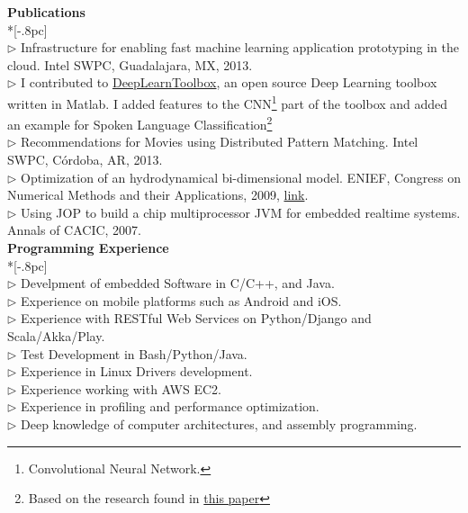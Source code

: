 \documentclass[letter,11pt,english]{article}
\begin{document}
{\bf Publications} \\*[-.8pc]
\underline{\hspace{6in}} \\
$\triangleright$ Infrastructure for enabling fast machine learning application prototyping in the cloud. Intel SWPC, Guadalajara, MX, 2013.\\
$\triangleright$ I contributed to \href{https://github.com/rasmusbergpalm/DeepLearnToolbox} {DeepLearnToolbox},
an open source Deep Learning toolbox written in Matlab. I added features to the CNN\footnote{Convolutional Neural Network.}
part of the toolbox and added an example for Spoken Language Classification\footnote{Based on the research found in
\href{http://research.microsoft.com/en-us/um/people/dongyu/nips2009/papers/montavon-paper.pdf} {this paper}} \\
$\triangleright$ Recommendations for Movies using Distributed Pattern Matching. Intel SWPC, C\'ordoba, AR, 2013.\\
$\triangleright$ Optimization of an hydrodynamical bi-dimensional model. ENIEF, Congress on Numerical Methods 
and their Applications, 2009, \href{http://www.cimec.org.ar/ojs/index.php/mc/article/viewFile/2930/2867}{link}. \\
$\triangleright$ Using JOP to build a chip multiprocessor JVM for embedded realtime systems. Annals of CACIC, 2007.\\

\newpage
{\large \bf Programming Experience} \\*[-.8pc]
\underline{\hspace{6in}} \\
$\triangleright$ Develpment of embedded Software in C/C++, and Java.\\
$\triangleright$ Experience on mobile platforms such as Android and iOS.\\
$\triangleright$ Experience with RESTful Web Services on Python/Django and Scala/Akka/Play.\\
$\triangleright$ Test Development in Bash/Python/Java.\\
$\triangleright$ Experience in Linux Drivers development.\\
$\triangleright$ Experience working with AWS EC2.\\
$\triangleright$ Experience in profiling and performance optimization.\\
$\triangleright$ Deep knowledge of computer architectures, and assembly programming.\\
\end{document}
